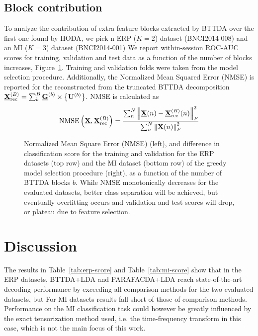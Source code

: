 \documentclass[twocolumn]{article}
\begin{document}
\subsection{Block contribution}
To analyze the contribution of extra feature blocks extracted by {BTTDA} over
the first one found by \textsc{HODA}, we pick n ERP ($K=2$) dataset
(BNCI2014-008) and an MI ($K=3$) dataset (BNCI2014-001)
We report within-session ROC-AUC scores for training, validation and test data as a function
of the number of blocks increases, Figure~\ref{fig:blocks}.
Training and validation folds were taken from the model selection procedure.
Additionally, the Normalized Mean Squared Error (NMSE) is reported for the
reconstructed from the truncated \textsc{BTTDA} decomposition
$\textstyle{\underline{\mathbf{X}}_\text{rec}^{(B)}=\sum_b^B\underline{\mathbf{G}}^{(b)}\times\left\{\mathbf{U}^{(b)}\right\}}$.
NMSE is calculated as
\begin{equation}
	\operatorname{NMSE}\left(\underline{\mathbf{X}}, \underline{\mathbf{X}}_\text{rec}^{(B)}\right) =
	\frac{\sum_n^N\left\lVert\underline{\mathbf{X}}(n)-\underline{\mathbf{X}}_\text{rec}^{(B)}(n)\right\rVert_F^2}
	{\sum_n^N\left\lVert\underline{\mathbf{X}}(n)\right\rVert_F^2}
\end{equation}
\begin{figure}[t]
	
	\caption{Normalized Mean Square Error (NMSE) (left), and difference in
    classification score for the training and validation for the ERP datasets
    (top row) and the MI dataset (bottom row)	of the greedy model selection
    procedure (right), as a function of the number of BTTDA blocks $b$.
		While NMSE monotonically decreases for the evaluated datasets, better class
		separation will be achieved, but eventually overfitting occurs and validation
		and test scores will drop, or plateau due to feature selection.
	}
	\label{fig:blocks}
\end{figure}


\section{Discussion}
The results in Table~\ref{tab:erp-score} and Table~\ref{tab:mi-score} show that
in the ERP datasets, BTTDA+LDA and PARAFACDA+LDA reach state-of-the-art decoding performance by
exceeding all comparison methods for the two evaluated datasets, but
For MI datasets results fall short of those of comparison methods.
Performance on the MI classification task could however be greatly influenced
by the exact tensorization method used, i.e. the time-frequency transform in
this case, which is not the main focus of this work.
\end{document}
